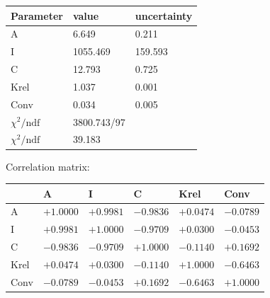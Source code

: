 \begin{tabular}{l|ll}
Parameter & value & uncertainty \\ \hline
 A & 6.649 & 0.211 \\ 
 I & 1055.469 & 159.593 \\ 
 C & 12.793 & 0.725 \\ 
 Krel & 1.037 & 0.001 \\ 
 Conv & 0.034 & 0.005 \\ 
 \hline
 $\chi^2/\mathrm{ndf}$ & 3800.743/97 & \\
 $\chi^2/\mathrm{ndf}$ & 39.183 & \\
\end{tabular}

Correlation matrix:

\begin{tabular}{l|lllll} 
 & A & I & C & Krel & Conv \\ \hline
 A & $+1.0000$ & $+0.9981$ & $-0.9836$ & $+0.0474$ & $-0.0789$ \\ 
 I & $+0.9981$ & $+1.0000$ & $-0.9709$ & $+0.0300$ & $-0.0453$ \\ 
 C & $-0.9836$ & $-0.9709$ & $+1.0000$ & $-0.1140$ & $+0.1692$ \\ 
 Krel & $+0.0474$ & $+0.0300$ & $-0.1140$ & $+1.0000$ & $-0.6463$ \\ 
 Conv & $-0.0789$ & $-0.0453$ & $+0.1692$ & $-0.6463$ & $+1.0000$ \\ 
\end{tabular}
